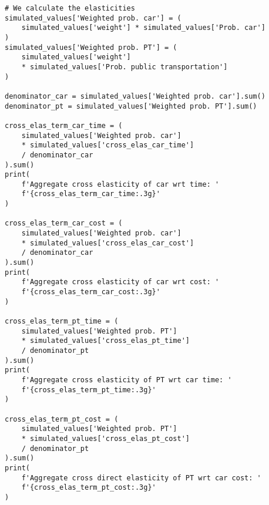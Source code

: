 \documentclass[12pt,a4paper]{article}
\begin{document}
\begin{lstlisting}[style=numbers]
# We calculate the elasticities
simulated_values['Weighted prob. car'] = (
    simulated_values['weight'] * simulated_values['Prob. car']
)
simulated_values['Weighted prob. PT'] = (
    simulated_values['weight']
    * simulated_values['Prob. public transportation']
)

denominator_car = simulated_values['Weighted prob. car'].sum()
denominator_pt = simulated_values['Weighted prob. PT'].sum()

cross_elas_term_car_time = (
    simulated_values['Weighted prob. car']
    * simulated_values['cross_elas_car_time']
    / denominator_car
).sum()
print(
    f'Aggregate cross elasticity of car wrt time: '
    f'{cross_elas_term_car_time:.3g}'
)

cross_elas_term_car_cost = (
    simulated_values['Weighted prob. car']
    * simulated_values['cross_elas_car_cost']
    / denominator_car
).sum()
print(
    f'Aggregate cross elasticity of car wrt cost: '
    f'{cross_elas_term_car_cost:.3g}'
)

cross_elas_term_pt_time = (
    simulated_values['Weighted prob. PT']
    * simulated_values['cross_elas_pt_time']
    / denominator_pt
).sum()
print(
    f'Aggregate cross elasticity of PT wrt car time: '
    f'{cross_elas_term_pt_time:.3g}'
)

cross_elas_term_pt_cost = (
    simulated_values['Weighted prob. PT']
    * simulated_values['cross_elas_pt_cost']
    / denominator_pt
).sum()
print(
    f'Aggregate cross direct elasticity of PT wrt car cost: '
    f'{cross_elas_term_pt_cost:.3g}'
)

\end{lstlisting}
\end{document}
